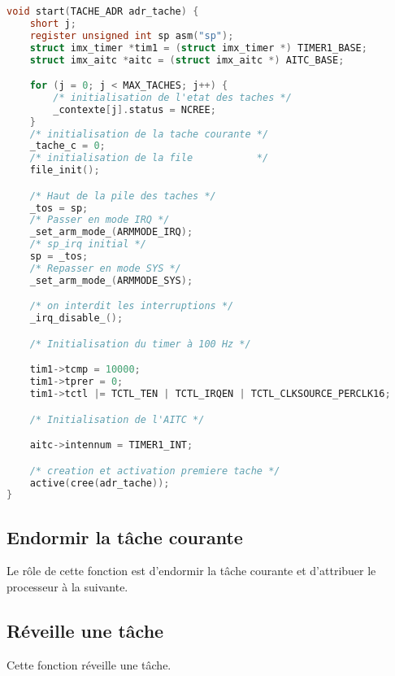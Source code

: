 \documentclass{article}
\begin{document}
\begin{lstlisting}[language=C, caption=noyau.c]
void start(TACHE_ADR adr_tache) {
    short j;
    register unsigned int sp asm("sp");
    struct imx_timer *tim1 = (struct imx_timer *) TIMER1_BASE;
    struct imx_aitc *aitc = (struct imx_aitc *) AITC_BASE;

    for (j = 0; j < MAX_TACHES; j++) {
        /* initialisation de l'etat des taches */
        _contexte[j].status = NCREE;
    }
    /* initialisation de la tache courante */
    _tache_c = 0;
    /* initialisation de la file           */
    file_init();

    /* Haut de la pile des taches */
    _tos = sp;
    /* Passer en mode IRQ */
    _set_arm_mode_(ARMMODE_IRQ);
    /* sp_irq initial */
    sp = _tos;
    /* Repasser en mode SYS */
    _set_arm_mode_(ARMMODE_SYS);

    /* on interdit les interruptions */
    _irq_disable_();

    /* Initialisation du timer à 100 Hz */

    tim1->tcmp = 10000;
    tim1->tprer = 0;
    tim1->tctl |= TCTL_TEN | TCTL_IRQEN | TCTL_CLKSOURCE_PERCLK16;

    /* Initialisation de l'AITC */

    aitc->intennum = TIMER1_INT;

    /* creation et activation premiere tache */
    active(cree(adr_tache));
}
\end{lstlisting}

\subsection{Endormir la tâche courante}
Le rôle de cette fonction est d'endormir la tâche courante et d'attribuer le processeur à la suivante.

\subsection{Réveille une tâche}
Cette fonction réveille une tâche.
\end{document}
